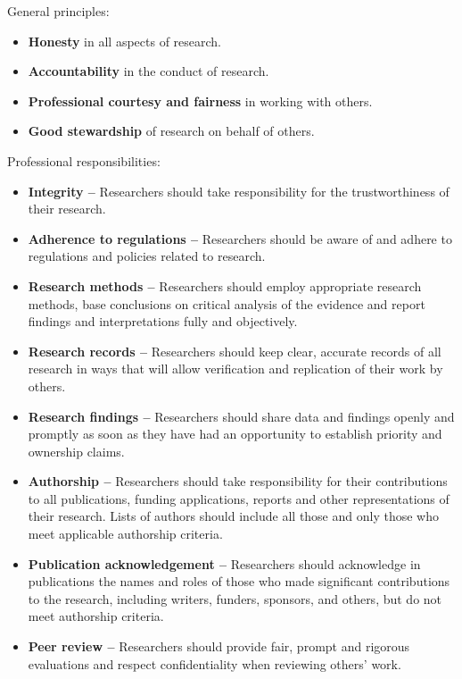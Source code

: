 \documentclass[
]{book}
\begin{document}
General principles:

\begin{itemize}
\item
  \textbf{Honesty} in all aspects of research.
\item
  \textbf{Accountability} in the conduct of research.
\item
  \textbf{Professional courtesy and fairness} in working with others.
\item
  \textbf{Good stewardship} of research on behalf of others.
\end{itemize}

Professional responsibilities:

\begin{itemize}
\item
  \textbf{Integrity --} Researchers should take responsibility for the trustworthiness of their research.
\item
  \textbf{Adherence to regulations --} Researchers should be aware of and adhere to regulations and policies related to research.
\item
  \textbf{Research methods --} Researchers should employ appropriate research methods, base conclusions on critical analysis of the evidence and report findings and interpretations fully and objectively.
\item
  \textbf{Research records --} Researchers should keep clear, accurate records of all research in ways that will allow verification and replication of their work by others.
\item
  \textbf{Research findings --} Researchers should share data and findings openly and promptly as soon as they have had an opportunity to establish priority and ownership claims.
\item
  \textbf{Authorship --} Researchers should take responsibility for their contributions to all publications, funding applications, reports and other representations of their research. Lists of authors should include all those and only those who meet applicable authorship criteria.
\item
  \textbf{Publication acknowledgement --} Researchers should acknowledge in publications the names and roles of those who made significant contributions to the research, including writers, funders, sponsors, and others, but do not meet authorship criteria.
\item
  \textbf{Peer review --} Researchers should provide fair, prompt and rigorous evaluations and respect confidentiality when reviewing others' work.

\end{itemize}
\end{document}
